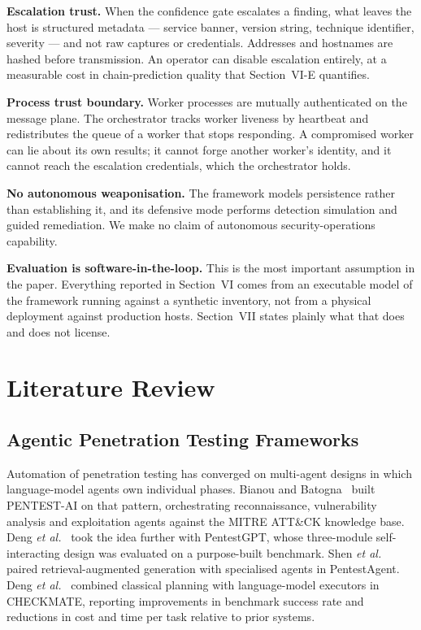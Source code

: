 \documentclass[journal]{IEEEtran}
\begin{document}
\textbf{Escalation trust.} When the confidence gate escalates a finding, what
leaves the host is structured metadata --- service banner, version string,
technique identifier, severity --- and not raw captures or credentials.
Addresses and hostnames are hashed before transmission. An operator can
disable escalation entirely, at a measurable cost in chain-prediction quality
that Section~VI-E quantifies.

\textbf{Process trust boundary.} Worker processes are mutually authenticated
on the message plane. The orchestrator tracks worker liveness by heartbeat and
redistributes the queue of a worker that stops responding. A compromised
worker can lie about its own results; it cannot forge another worker's
identity, and it cannot reach the escalation credentials, which the
orchestrator holds.

\textbf{No autonomous weaponisation.} The framework models persistence rather
than establishing it, and its defensive mode performs detection simulation and
guided remediation. We make no claim of autonomous security-operations
capability.

\textbf{Evaluation is software-in-the-loop.} This is the most important
assumption in the paper. Everything reported in Section~VI comes from an
executable model of the framework running against a synthetic inventory, not
from a physical deployment against production hosts. Section~VII states
plainly what that does and does not license.

\section{Literature Review}

\subsection{Agentic Penetration Testing Frameworks}

Automation of penetration testing has converged on multi-agent designs in
which language-model agents own individual phases. Bianou and
Batogna~\cite{bianou2024} built PENTEST-AI on that pattern, orchestrating
reconnaissance, vulnerability analysis and exploitation agents against the
MITRE ATT\&CK knowledge base. Deng \emph{et al.}~\cite{deng2024} took the idea
further with PentestGPT, whose three-module self-interacting design was
evaluated on a purpose-built benchmark. Shen \emph{et al.}~\cite{shen2024}
paired retrieval-augmented generation with specialised agents in PentestAgent.
Deng \emph{et al.}~\cite{deng2024checkmate} combined classical planning with
language-model executors in CHECKMATE, reporting improvements in benchmark
success rate and reductions in cost and time per task relative to prior
systems.
\end{document}
